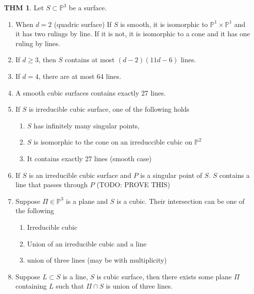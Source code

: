 \documentclass[twocolumn]{article}
\renewcommand{\P}{\mathbb{P}}
\theoremstyle{definition}
\newtheorem{thm}{THM}
\theoremstyle{remark}
\begin{document}
\begin{thm}
Let $S \subset \P^3$ be a surface.
	\begin{enumerate}
		\item When $d = 2$ (quadric surface) If $S$ is smooth, it is isomorphic to $\P^1 \times \P^1$ and it has two rulings by line. If it is not, it is isomorphic to a cone and it has one ruling by lines.
		\item If $d \geq 3$, then $S$ contains at most $(d-2)(11d-6)$ lines. \item If $d = 4$, there are at most 64 lines.
		\item A smooth cubic surfaces contains exactly 27 lines.
		\item If $S$ is irreducible cubic surface, one of the following holds	\begin{enumerate}
			\item $S$ has infinitely many singular points,
			\item $S$ is isomorphic to the cone on an irreduccible cubic on $\P^2$
			\item It contains exactly 27 lines (smooth case)
			\end{enumerate}
		\item If $S$ is an irreducible cubic surface and $P$ is a singular point of $S$. $S$ contains a line that passes through $P$ (TODO: PROVE THIS)
		\item Suppose $\Pi \in \P^3$ is a plane and $S$ is a cubic. Their intersection can be one of the following 
			\begin{enumerate}
				\item Irreducible cubic 
				\item Union of an irreducible cubic and a line 
				\item union of three lines (may be with multiplicity)
			\end{enumerate}
		\item Suppose $L\subset S$ is a line, $S$ is cubic surface, then there exists some plane $\Pi$ containing $L$ such that $\Pi \cap S$ is union of three lines.
	\end{enumerate}
\end{thm}
\end{document}
